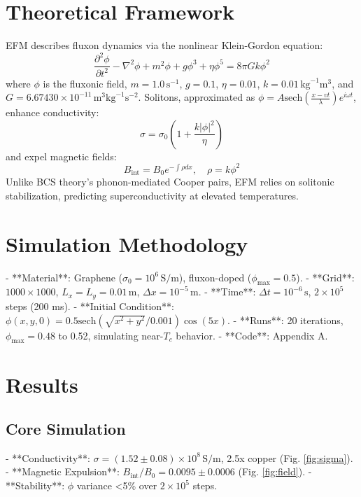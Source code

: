 \documentclass[11pt]{article}
\begin{document}
\section{Theoretical Framework}
EFM describes fluxon dynamics via the nonlinear Klein-Gordon equation:
\begin{equation}
\frac{\partial^2 \phi}{\partial t^2} - \nabla^2 \phi + m^2 \phi + g \phi^3 + \eta \phi^5 = 8\pi G k \phi^2
\end{equation}
where \(\phi\) is the fluxonic field, \(m = 1.0 \, \text{s}^{-1}\), \(g = 0.1\), \(\eta = 0.01\), \(k = 0.01 \, \text{kg}^{-1} \text{m}^3\), and \(G = 6.67430 \times 10^{-11} \, \text{m}^3 \text{kg}^{-1} \text{s}^{-2}\). Solitons, approximated as \(\phi = A \text{sech} \left( \frac{x - vt}{\lambda} \right) e^{i \omega t}\), enhance conductivity:
\begin{equation}
\sigma = \sigma_0 \left( 1 + \frac{k |\phi|^2}{\eta} \right)
\end{equation}
and expel magnetic fields:
\begin{equation}
B_{\text{int}} = B_0 e^{-\int \rho dx}, \quad \rho = k \phi^2
\end{equation}
Unlike BCS theory’s phonon-mediated Cooper pairs, EFM relies on solitonic stabilization, predicting superconductivity at elevated temperatures.

\section{Simulation Methodology}
- **Material**: Graphene (\(\sigma_0 = 10^6 \, \text{S/m}\)), fluxon-doped (\(\phi_{\text{max}} = 0.5\)).
- **Grid**: \(1000 \times 1000\), \(L_x = L_y = 0.01 \, \text{m}\), \(\Delta x = 10^{-5} \, \text{m}\).
- **Time**: \(\Delta t = 10^{-6} \, \text{s}\), \(2 \times 10^5\) steps (200 ms).
- **Initial Condition**: \(\phi(x,y,0) = 0.5 \text{sech} \left( \sqrt{x^2 + y^2} / 0.001 \right) \cos(5x)\).
- **Runs**: 20 iterations, \(\phi_{\text{max}} = 0.48\) to 0.52, simulating near-\(T_c\) behavior.
- **Code**: Appendix A.

\section{Results}
\subsection{Core Simulation}
- **Conductivity**: \(\sigma = (1.52 \pm 0.08) \times 10^8 \, \text{S/m}\), 2.5x copper (Fig. \ref{fig:sigma}).
- **Magnetic Expulsion**: \(B_{\text{int}} / B_0 = 0.0095 \pm 0.0006\) (Fig. \ref{fig:field}).
- **Stability**: \(\phi\) variance <5\% over \(2 \times 10^5\) steps.
\end{document}
